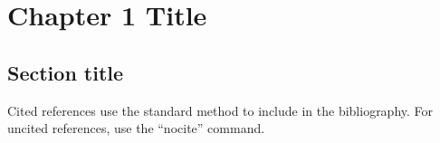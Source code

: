 
\chapter{Chapter 1 Title}
\label{chap1}
\section{Section title}
Cited references use the standard method to include in the bibliography. For uncited references, use the ``nocite'' command.

\cite{higham1993accuracy}
\nocite{higham2019new}

